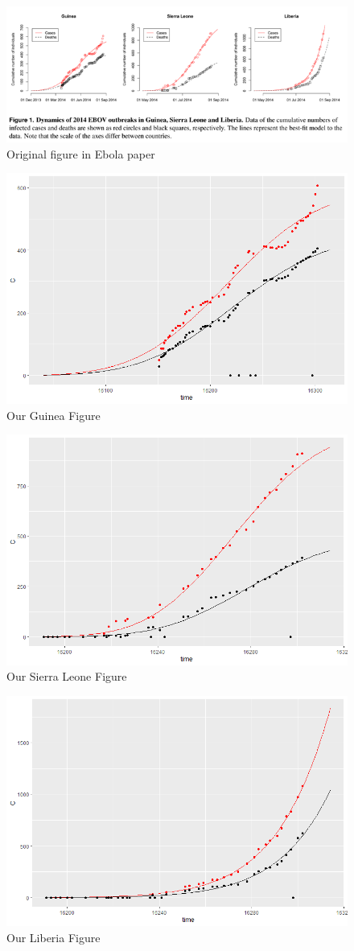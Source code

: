 \begin{figure}[h]
	\centering
	\includegraphics[width=1\linewidth]{./figures/original_figure_SEIR_paper}
	\caption{Original figure in Ebola paper}
	\label{fig:original_figure_SEIR_paper}
\end{figure}

\begin{figure}[h]
	\centering
	\includegraphics[width=0.7\linewidth]{./figures/my_fit_Gui}
	\caption{Our Guinea Figure}
	\label{fig:my_fit_Gui}
\end{figure}

\begin{figure}[h]
	\centering
	\includegraphics[width=0.7\linewidth]{./figures/my_fit_SL}
	\caption{Our Sierra Leone Figure}
	\label{fig:my_fit_SL}
\end{figure}

\begin{figure}[h]
	\centering
	\includegraphics[width=0.7\linewidth]{./figures/my_fit_Lib}
	\caption{Our Liberia Figure}
	\label{fig:my_fit_Lib}
\end{figure}
